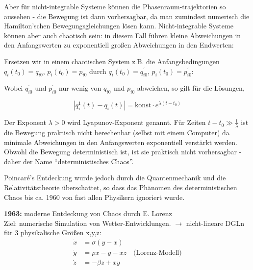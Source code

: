 \documentclass[10pt, letterpaper]{article}
\begin{document}
\begin{center}
\end{center}

\noindent
Aber für nicht-integrable Systeme können die Phasenraum-trajektorien so aussehen - die Bewegung ist dann vorhersagbar, da man zumindest numerisch die Hamilton'schen Bewegungsgleichungen lösen kann. Nicht-integrable Systeme können aber auch chaotisch sein: in diesem Fall führen kleine Abweichungen in den Anfangswerten zu exponentiell großen Abweichungen in den Endwerten:


\noindent
Ersetzen wir in einem chaotischen System z.B. die Anfangsbedingungen $q_i(t_0)=q_{i0}$, $p_i(t_0)=p_{i0}$ durch $q_i(t_0)=q_{i0}^\prime$, $p_i(t_0)=p_{i0}^\prime$:



Wobei $q^\prime_{i0}$ und $p^\prime_{i0}$ nur wenig von $q_{i0}$ und $p_{i0}$ abweichen, so gilt für die Lösungen,

\[|q^1_i(t) - q_i(t)| = \text{konst} \cdot e^{\lambda(t-t_0)}\]

Der Exponent $\lambda > 0$ wird Lyapunov-Exponent genannt. Für Zeiten $t-t_0 \gg \frac{1}{\lambda}$ ist die Bewegung praktisch nicht berechenbar (selbst mit einem Computer) da minimale Abweichungen in den Anfangswerten exponentiell verstärkt werden. Obwohl die Bewegung deterministisch ist, ist sie praktisch nicht vorhersagbar - daher der Name ``deterministisches Chaos''.

Poincaré's Entdeckung wurde jedoch durch die Quantenmechanik und die Relativitätstheorie überschattet, so dass das Phänomen des deterministischen Chaos bis ca. 1960 von fast allen Physikern ignoriert wurde.

\vspace{1cm}
\noindent\textbf{1963:} moderne Entdeckung von Chaos durch E. Lorenz\\
Ziel: numerische Simulation von Wetter-Entwicklungen. $\rightarrow$ nicht-lineare DGLn für 3 physikalische Größen x,y,z:
\begin{align*}
\dot{x} &= \sigma(y-x)\\
\dot{y} &= \rho x - y - xz \quad \text{(Lorenz-Modell)}\\
\dot{z} &= -\beta z + xy
\end{align*}
\end{document}
